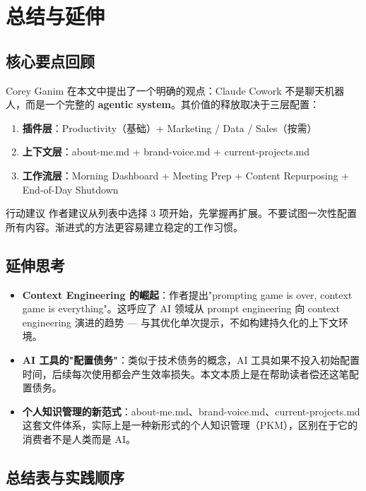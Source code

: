 \section{总结与延伸}

\subsection{核心要点回顾}

Corey Ganim 在本文中提出了一个明确的观点：Claude Cowork 不是聊天机器人，而是一个完整的 \textbf{agentic system}。其价值的释放取决于三层配置：

\begin{enumerate}
    \item \textbf{插件层}：Productivity（基础）+ Marketing / Data / Sales（按需）
    \item \textbf{上下文层}：about-me.md + brand-voice.md + current-projects.md
    \item \textbf{工作流层}：Morning Dashboard + Meeting Prep + Content Repurposing + End-of-Day Shutdown
\end{enumerate}

\begin{importantbox}{行动建议}
作者建议从列表中选择 3 项开始，先掌握再扩展。不要试图一次性配置所有内容。渐进式的方法更容易建立稳定的工作习惯。
\end{importantbox}

\subsection{延伸思考}

\begin{itemize}
    \item \textbf{Context Engineering 的崛起}：作者提出"prompting game is over, context game is everything"。这呼应了 AI 领域从 prompt engineering 向 context engineering 演进的趋势 --- 与其优化单次提示，不如构建持久化的上下文环境。
    \item \textbf{AI 工具的"配置债务"}：类似于技术债务的概念，AI 工具如果不投入初始配置时间，后续每次使用都会产生效率损失。本文本质上是在帮助读者偿还这笔配置债务。
    \item \textbf{个人知识管理的新范式}：about-me.md、brand-voice.md、current-projects.md 这套文件体系，实际上是一种新形式的个人知识管理（PKM），区别在于它的消费者不是人类而是 AI。
\end{itemize}

\subsection{总结表与实践顺序}

